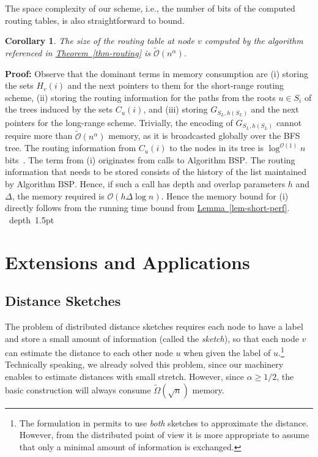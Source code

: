 \documentclass[letterpaper,11pt]{article}
\newcommand{\namedref}[2]{\hyperref[#2]{#1~\ref*{#2}}}
\newcommand{\theoremref}[1]{\namedref{Theorem}{#1}}
\newcommand{\lemmaref}[1]{\namedref{Lemma}{#1}}
\newtheorem{corollary}[theorem]{Corollary}
\newcommand{\blackslug}{\hbox{\hskip 1pt \vrule width 4pt height 8pt
depth 1.5pt \hskip 1pt}}
\newcommand{\QED}{\quad\blackslug\lower 8.5pt\null\par}
\newenvironment{proof}[1][Proof:]{\noindent \textbf{#1}\xspace}{\QED}
\newcommand{\BO}{\mathcal{O}}
\newcommand{\BSP}{\mathrm{BSP}\xspace}
\begin{document}
The space complexity of our scheme, i.e., the number of bits of the computed
routing tables, is also straightforward to bound.

\begin{corollary}\label{coro:space}
The size of the routing table at node $v$ computed by the algorithm referenced
in \theoremref{thm-routing} is $\tilde{\BO}(n^{\alpha})$.
\end{corollary}
\begin{proof}
Observe that the dominant terms in memory consumption are (i) storing the sets
$H_v(i)$ and the next pointers to them for the short-range routing scheme, (ii)
storing the routing information for the paths from the roots $u\in S_i$ of the
trees induced by the sets $C_u(i)$, and (iii) storing $G_{S_L,h(S_L)}$ and the
next pointers for the long-range scheme. Trivially, the encoding of
$G_{S_L,h(S_L)}$ cannot require more than $\tilde{\BO}(n^{\alpha})$ memory, as
it is broadcasted globally over the BFS tree. The routing information from
$C_u(i)$ to the nodes in its tree is $\log^{\BO(1)}n$ bits~\cite{TZ-routing}. The
term from (i) originates from calls to Algorithm $\BSP$. The routing information
that needs to be stored consists of the history of the list maintained by
Algorithm $\BSP$. Hence, if such a call has depth and overlap parameters $h$ and
$\Delta$, the memory required is $\BO(h\Delta \log n)$. Hence the memory bound
for (i) directly follows from the running time bound from
\lemmaref{lem-short-perf}.
\end{proof}

\section{Extensions and Applications}
\label{sec-ext}

\subsection{Distance Sketches}

The problem of distributed distance sketches requires each node to
have a label and store a small amount of information (called the
\emph{sketch}), so that each node $v$ can estimate the distance to
each other node $u$ when given the label of $u$.\footnote{The formulation in \cite{DDP} permits to use \emph{both} sketches to
  approximate the distance. However, from the distributed point of
  view it is more appropriate to assume that only a minimal amount of
  information is exchanged.}
Technically speaking, we already solved this problem, since our machinery
enables to estimate distances with small stretch. However, since $\alpha\geq
1/2$, the basic construction will always consume $\tilde\Omega(\sqrt{n})$
memory.
\end{document}
